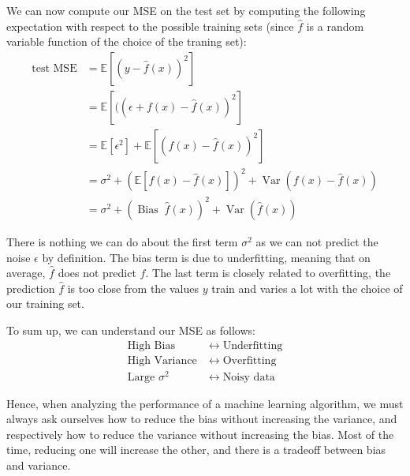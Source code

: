 We can now compute our MSE on the test set by computing the following expectation
with respect to the possible training sets (since $\hat{f}$ is a random variable function of the choice
of the traning set):
\begin{align}
\text{test MSE} &= \mathbb E\left[(y - \hat{f}(x))^2 \right]\\
    &= \mathbb E\left[((\epsilon + f(x) - \hat{f}(x))^2 \right]\\
    &= \mathbb E[\epsilon^2] + \mathbb E\left[(f(x) - \hat{f}(x))^2 \right]\\
    &= \sigma^2 + \left( \mathbb E[f(x) - \hat{f}(x)] \right)^2 + \operatorname{Var}\left(f(x) - \hat{f}(x)\right)\\
    &= \sigma^2 + \left(\operatorname{Bias}\; \hat{f}(x)\right)^2 + \operatorname{Var}\left( \hat{f}(x) \right)
\end{align}

There is nothing we can do about the first term $\sigma^2$ as we can not predict the noise $\epsilon$ by
definition. The bias term is due to underfitting, meaning that on average, $\hat{f}$ does not predict
$f$. The last term is closely related to overfitting, the prediction $\hat{f}$ is too close from the values
$y$ train and varies a lot with the choice of our training set.

To sum up, we can understand our MSE as follows:
\begin{align*}
    \text{High Bias} &\;\longleftrightarrow\; \text{Underfitting}\\
    \text{High Variance} &\;\longleftrightarrow\; \text{Overfitting}\\
    \text{Large $\sigma^2$} &\;\longleftrightarrow\; \text{Noisy data}
\end{align*}

Hence, when analyzing the performance of a machine learning algorithm, we must always
ask ourselves how to reduce the bias without increasing the variance, and respectively how to
reduce the variance without increasing the bias. Most of the time, reducing one will increase
the other, and there is a tradeoff between bias and variance.

